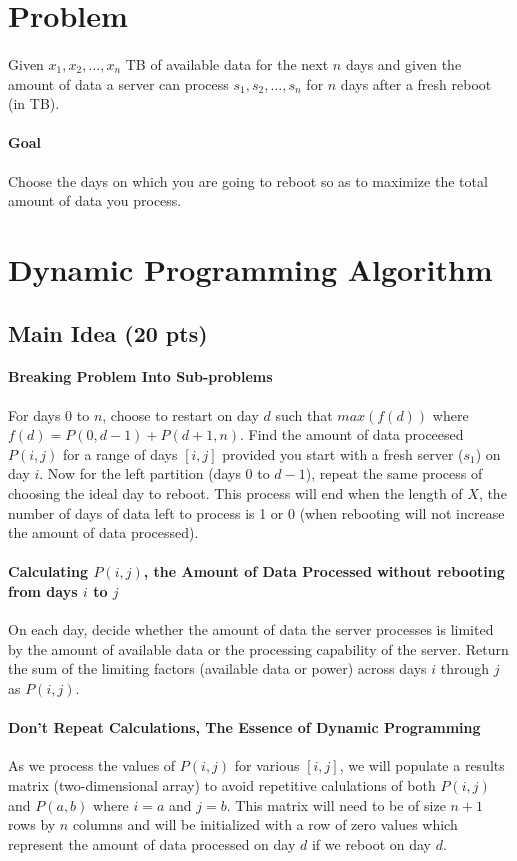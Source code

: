\documentclass[12pt]{article}
\begin{document}
\section{Problem}
\paragraph{}
Given $x_1, x_2, \dots, x_n$ TB of available data for the next $n$ days and given the amount of data a server can process $s_1, s_2, \dots, s_n$ for $n$ days after a fresh reboot (in TB).
\paragraph{Goal}
Choose the days on which you are going to reboot so as to maximize the total amount of data you process.
\section{Dynamic Programming Algorithm}
\subsection{Main Idea (20 pts)}
\paragraph{Breaking Problem Into Sub-problems}
For days $0$ to $n$, choose to restart on day $d$ such that $max(f(d))$ where $f(d) = P(0,d-1) + P(d+1,n)$.
Find the amount of data proceesed $P(i,j)$ for a range of days $[i, j]$ provided you start with a fresh server ($s_1$) on day $i$.
Now for the left partition (days $0$ to $d-1$), repeat the same process of choosing the ideal day to reboot.
This process will end when the length of $X$, the number of days of data left to process is 1 or 0 (when rebooting will not increase the amount of data processed).
\paragraph{Calculating $P(i, j)$, the Amount of Data Processed without rebooting from days $i$ to $j$}
On each day, decide whether the amount of data the server processes is limited by the amount of available data or the processing capability of the server. Return the sum of the limiting factors (available data or power) across days $i$ through $j$ as $P(i, j)$.
\paragraph{Don't Repeat Calculations, The Essence of Dynamic Programming}
As we process the values of $P(i, j)$ for various $[i, j]$, we will populate a results matrix (two-dimensional array) to avoid repetitive calulations of both $P(i, j)$ and $P(a, b)$ where $i = a$ and $j = b$.
This matrix will need to be of size $n+1$ rows by $n$ columns and will be initialized with a row of zero values which represent the amount of data processed on day $d$ if we reboot on day $d$.
\end{document}
